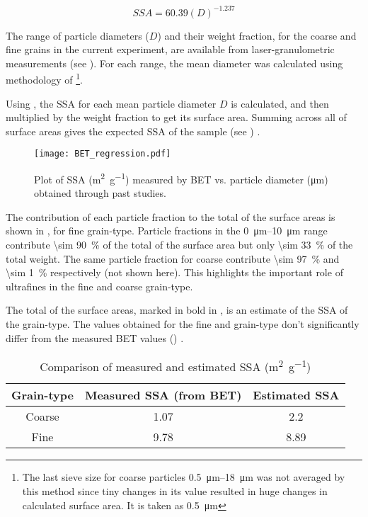 \begin{equation}\label{eq:app_bet}
SSA=\num{60.39}(D)^{\num{-1.237}}
\end{equation} 

The range of particle diameters ($D$) and their weight fraction, for the coarse and fine grains in the current experiment, are available from laser-granulometric measurements (see ). For each range, the mean diameter was calculated using methodology of \cite{tester1994} \footnote{The last sieve size for coarse particles \SIrange[range-units = single,range-phrase = --]{0.5}{18}{\micro\metre} was not averaged by this method since tiny changes in its value resulted in huge changes in calculated surface area. It is taken as \SI{0.5}{\micro\meter}}.

Using , the SSA for each mean particle diameter $D$ is calculated, and then multiplied by the weight fraction to get its surface area. Summing across all of surface areas gives the expected SSA of the sample (see ) .\\

\begin{figure}[h]
\centering
\texttt{[image: BET\_regression.pdf]}
\caption{Plot of SSA (\si{\square \metre\per\gram}) measured by BET vs. particle diameter (\si{\micro\meter}) obtained through past studies.}
\label{fig:BET_regression}
\end{figure}

The contribution of each particle fraction to the total of the surface areas is shown in , for fine grain-type. Particle fractions in the \SIrange[range-units = single,range-phrase = --]{0}{10}{\micro\metre} range contribute \SI{\sim 90}{\percent} of the total of the surface area but only \SI{\sim 33}{\percent} of the total weight. The same particle fraction for coarse contribute \SI{\sim 97}{\percent} and  \SI{\sim 1}{\percent} respectively (not shown here). This highlights the important role of ultrafines in the fine and coarse grain-type.

The total of the surface areas, marked in bold in , is an estimate of the SSA of the grain-type. The values obtained for the fine and grain-type don't significantly differ from the measured BET values () .

 \begin{table}[h]
   \centering
     \begin{tabular}{ccc}
     \toprule
     \textbf{Grain-type} & \multicolumn{1}{l}{\textbf{Measured SSA (from BET)}} & \multicolumn{1}{l}{\textbf{Estimated SSA}} \\
     \midrule
     Coarse & 1.07 & 2.2 \\
     Fine & 9.78 & 8.89 \\
     \bottomrule
     \end{tabular}%
     
   \caption{Comparison of measured and estimated SSA (\si{\square\metre\per\gram}) }
   \label{tab:app_concl.}%
 \end{table}%

